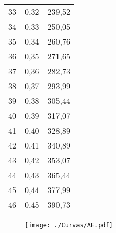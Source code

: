 \documentclass[]{article}
\begin{document}
\begin{longtable}[t]{ccc}
33 & 0,32 & 239,52\\
34 & 0,33 & 250,05\\
35 & 0,34 & 260,76\\
36 & 0,35 & 271,65\\
37 & 0,36 & 282,73\\
38 & 0,37 & 293,99\\
39 & 0,38 & 305,44\\
40 & 0,39 & 317,07\\
41 & 0,40 & 328,89\\
42 & 0,41 & 340,89\\
43 & 0,42 & 353,07\\
44 & 0,43 & 365,44\\
45 & 0,44 & 377,99\\
46 & 0,45 & 390,73\\*
\end{longtable}

\clearpage

\begin{sidewaysfigure}[htb]
   \centering
   \texttt{[image: ./Curvas/AE.pdf]}
\end{sidewaysfigure}

\clearpage
\end{document}
